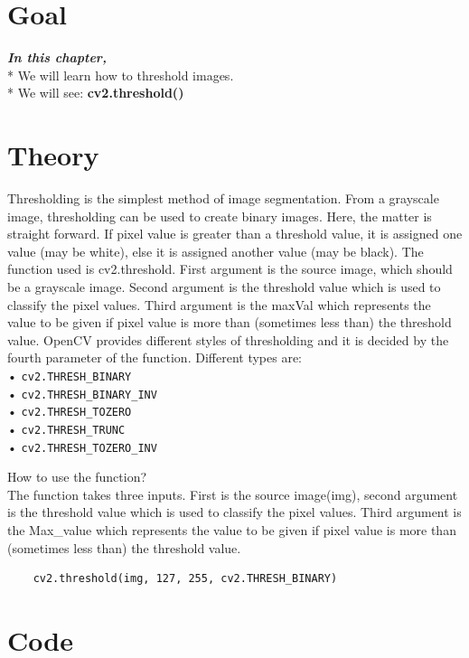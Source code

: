 \documentclass[]{article}
\date{}
\begin{document}
\section{Goal}\label{goal}

\emph{\textbf{In this chapter,}} \\
* We will learn how to threshold images. \\
* We will see: \textbf{cv2.threshold()}

\section{Theory}\label{theory}

Thresholding is the simplest method of image segmentation. From a
grayscale image, thresholding can be used to create binary images. Here,
the matter is straight forward. If pixel value is greater than a
threshold value, it is assigned one value (may be white), else it is
assigned another value (may be black). The function used is
cv2.threshold. First argument is the source image, which should be a
grayscale image. Second argument is the threshold value which is used to
classify the pixel values. Third argument is the maxVal which represents
the value to be given if pixel value is more than (sometimes less than)
the threshold value. OpenCV provides different styles of thresholding
and it is decided by the fourth parameter of the function. Different
types are:\\
• \texttt{cv2.THRESH\_BINARY}\\
• \texttt{cv2.THRESH\_BINARY\_INV}\\
• \texttt{cv2.THRESH\_TOZERO}\\
• \texttt{cv2.THRESH\_TRUNC}\\
• \texttt{cv2.THRESH\_TOZERO\_INV}

How to use the function?\\
The function takes three inputs. First is the source image(img), second
argument is the threshold value which is used to classify the pixel
values. Third argument is the Max\_value which represents the value to
be given if pixel value is more than (sometimes less than) the threshold
value.
\begin{verbatim}
	cv2.threshold(img, 127, 255, cv2.THRESH_BINARY)
\end{verbatim}

\section{Code}\label{code}
\end{document}
